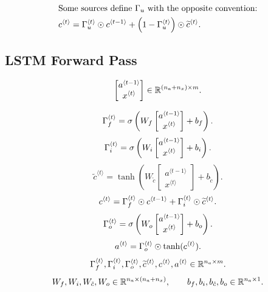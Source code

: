 \[
\begin{aligned}
&\text{Some sources define } \Gamma_u \text{ with the opposite convention:}\\
&c^{\langle t\rangle}
=
\Gamma_u^{\langle t\rangle}
\odot
c^{\langle t-1\rangle}
+
\left(
1-\Gamma_u^{\langle t\rangle}
\right)
\odot
\widetilde{c}^{\langle t\rangle}.
\end{aligned}
\]

\subsection{LSTM Forward Pass}

\[
\begin{bmatrix}
a^{\langle t-1\rangle}\\
x^{\langle t\rangle}
\end{bmatrix}
\in
\mathbb{R}^{(n_a+n_x)\times m}.
\]

\[
\Gamma_f^{\langle t\rangle}
=
\sigma
\left(
W_f
\begin{bmatrix}
a^{\langle t-1\rangle}\\
x^{\langle t\rangle}
\end{bmatrix}
+
b_f
\right).
\]
\[
\Gamma_i^{\langle t\rangle}
=
\sigma
\left(
W_i
\begin{bmatrix}
a^{\langle t-1\rangle}\\
x^{\langle t\rangle}
\end{bmatrix}
+
b_i
\right).
\]
\[
\widetilde{c}^{\langle t\rangle}
=
\tanh
\left(
W_{\tilde{c}}
\begin{bmatrix}
a^{\langle t-1\rangle}\\
x^{\langle t\rangle}
\end{bmatrix}
+
b_{\tilde{c}}
\right).
\]
\[
c^{\langle t\rangle}
=
\Gamma_f^{\langle t\rangle}
\odot
c^{\langle t-1\rangle}
+
\Gamma_i^{\langle t\rangle}
\odot
\widetilde{c}^{\langle t\rangle}.
\]
\[
\Gamma_o^{\langle t\rangle}
=
\sigma
\left(
W_o
\begin{bmatrix}
a^{\langle t-1\rangle}\\
x^{\langle t\rangle}
\end{bmatrix}
+
b_o
\right).
\]
\[
a^{\langle t\rangle}
=
\Gamma_o^{\langle t\rangle}
\odot
\tanh(c^{\langle t\rangle}).
\]
\[
\Gamma_f^{\langle t\rangle},
\Gamma_i^{\langle t\rangle},
\Gamma_o^{\langle t\rangle},
\widetilde{c}^{\langle t\rangle},
c^{\langle t\rangle},
a^{\langle t\rangle}
\in
\mathbb{R}^{n_a \times m}.
\]
\[
W_f,W_i,W_{\tilde{c}},W_o
\in
\mathbb{R}^{n_a \times (n_a+n_x)},
\qquad
b_f,b_i,b_{\tilde{c}},b_o
\in
\mathbb{R}^{n_a \times 1}.
\]

